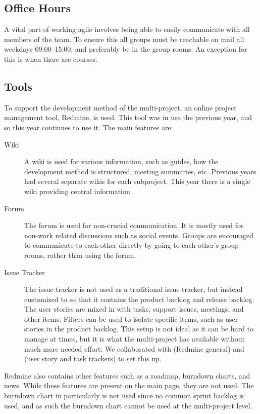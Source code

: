 \subsection{Office Hours}
A vital part of working agile involves being able to easily communicate with all members of the team. To ensure this all groups must be reachable on mail all weekdays 09:00--15:00, and preferably be in the group rooms. An exception for this is when there are courses.

\subsection{Tools}\label{sec:tools}
To support the development method of the multi-project, an online project management tool, Redmine, is used. This tool was in use the previous year, and so this year continues to use it. The main features are:

\begin{description}
  \item[Wiki] A wiki is used for various information, such as guides, how the development method is structured, meeting summaries, etc. Previous years had several separate wikis for each subproject. This year there is a single wiki providing central information.
  \item[Forum] The forum is used for non-crucial communication. It is mostly used for non-work related discussions such as social events. Groups are encouraged to communicate to each other directly by going to each other's group rooms, rather than using the forum.
  \item[Issue Tracker] The issue tracker is not used as a traditional issue tracker, but instead customized to so that it contains the product backlog and release backlog. The user stories are mixed in with tasks, support issues, meetings, and other items. Filters can be used to isolate specific items, such as user stories in the product backlog. This setup is not ideal as it can be hard to manage at times, but it is what the multi-project has available without much more needed effort. We collaborated with  (Redmine general) and  (user story and task trackers) to set this up.
\end{description}

Redmine also contains other features such as a roadmap, burndown charts, and news. While these features are present on the main page, they are not used. The burndown chart in particularly is not used since no common sprint backlog is used, and as such the burndown chart cannot be used at the multi-project level.

